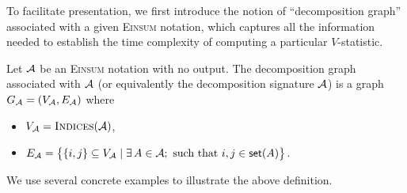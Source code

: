 \documentclass[letterpaper,11pt]{article}
\newcommand{\Lin}[1]{{\color{purple}{Lin: #1}}}
\def\Einsum{\textsc{Einsum}}
\newcommand{\takesetp}[1]{\mathsf{set}(#1)}
\newcommand{\indexset}{\textsc{Indices}}
\newcommand{\graphform}[1]{G_{#1}}
\begin{document}
\begin{bibunit}[plainnat]
To facilitate presentation, we first introduce the notion of ``decomposition graph'' associated with a given \Einsum{} notation, which captures all the information needed to establish the time complexity of computing a particular $V$-statistic.

\begin{definition}\label{def:graph_decomp}
Let ${\mathcal{A}}$ be an \Einsum{} notation with no output. The decomposition graph associated with ${\mathcal{A}}$ (or equivalently the decomposition signature ${\mathcal{A}}$) is a graph $\graphform{\calA} = (V_{\calA}, E_{\calA})$ where
    \begin{itemize}
        \item $V_{\calA} = \indexset(\calA)$, 
        \item $E_{\calA} = \big\{ \{i, j\} \subseteq V_{\calA} \mid \exists \, A \in \calA; \text{ such that } i, j \in \takesetp{A} \big\}$.
    \end{itemize}
\end{definition}



We use several concrete examples to illustrate the above definition.


\end{bibunit}
\end{document}

